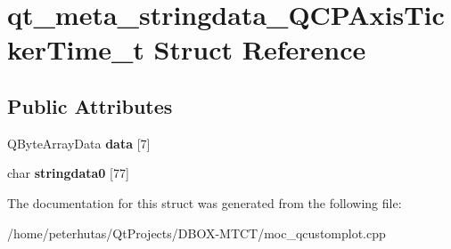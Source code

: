 \hypertarget{structqt__meta__stringdata___q_c_p_axis_ticker_time__t}{}\section{qt\+\_\+meta\+\_\+stringdata\+\_\+\+Q\+C\+P\+Axis\+Ticker\+Time\+\_\+t Struct Reference}
\label{structqt__meta__stringdata___q_c_p_axis_ticker_time__t}
\subsection*{Public Attributes}
\begin{DoxyCompactItemize}
\item 
\mbox{\label{structqt__meta__stringdata___q_c_p_axis_ticker_time__t_a0e812edae0b72b531ae152e0bed2a3f5}} 
Q\+Byte\+Array\+Data {\bfseries data} \mbox{[}7\mbox{]}
\item 
\mbox{\label{structqt__meta__stringdata___q_c_p_axis_ticker_time__t_aad085a5c9bf7f31e1826758e85aebe4e}} 
char {\bfseries stringdata0} \mbox{[}77\mbox{]}
\end{DoxyCompactItemize}


The documentation for this struct was generated from the following file\+:\begin{DoxyCompactItemize}
\item 
/home/peterhutas/\+Qt\+Projects/\+D\+B\+O\+X-\/\+M\+T\+C\+T/moc\+\_\+qcustomplot.\+cpp\end{DoxyCompactItemize}
